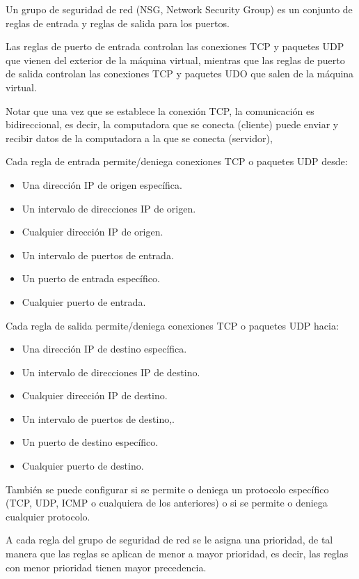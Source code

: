 Un grupo de seguridad de red (NSG, Network Security Group) es un conjunto de reglas de entrada y reglas de salida para los puertos.

Las reglas de puerto de entrada controlan las conexiones TCP y paquetes UDP que vienen del exterior de la máquina virtual, mientras que las reglas de puerto de salida controlan las conexiones TCP y paquetes UDO que salen de la máquina virtual.

Notar que una vez que se establece la conexión TCP, la comunicación es bidireccional, es decir, la computadora que se conecta (cliente) puede enviar y recibir datos de la computadora a la que se conecta (servidor),

Cada regla de entrada permite/deniega conexiones TCP o paquetes UDP desde:

\begin{itemize}
\item Una dirección IP de origen específica.
\item Un intervalo de direcciones IP de origen.
\item Cualquier dirección IP de origen.
\item Un intervalo de puertos de entrada.
\item Un puerto de entrada específico.
\item Cualquier puerto de entrada.
\end{itemize}

Cada regla de salida permite/deniega conexiones TCP o paquetes UDP hacia:

\begin{itemize}
\item Una dirección IP de destino específica.
\item Un intervalo de direcciones IP de destino.
\item Cualquier dirección IP de destino.
\item Un intervalo de puertos de destino,.
\item Un puerto de destino específico.
\item Cualquier puerto de destino.
\end{itemize}

También se puede configurar si se permite o deniega un protocolo específico (TCP, UDP, ICMP o cualquiera de los anteriores) o si se permite o deniega cualquier protocolo.

A cada regla del grupo de seguridad de red se le asigna una prioridad, de tal manera que las reglas se aplican de menor a mayor prioridad, es decir, las reglas con menor prioridad tienen mayor precedencia.

